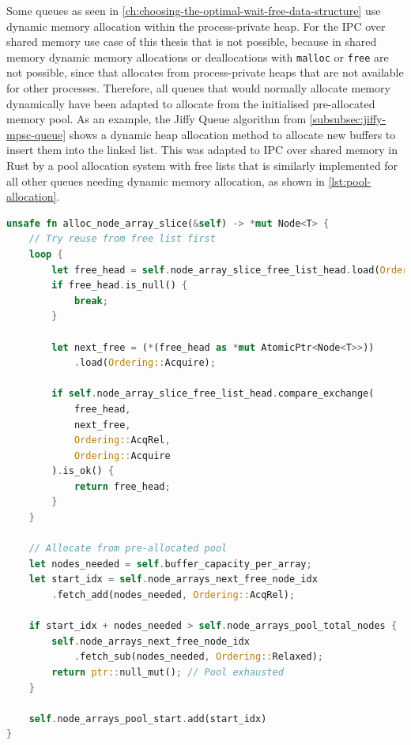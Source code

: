 Some queues as seen in \cref{ch:choosing-the-optimal-wait-free-data-structure} use dynamic memory allocation within the process-private heap. For the \ac{IPC} over shared memory use case of this thesis that is not possible, because in shared memory dynamic memory allocations or deallocations with \texttt{malloc} or \texttt{free} are not possible, since that allocates from process-private heaps that are not available for other processes. Therefore, all queues that would normally allocate memory dynamically have been adapted to allocate from the initialised pre-allocated memory pool. As an example, the Jiffy Queue algorithm from \cref{subsubsec:jiffy-mpsc-queue} shows a dynamic heap allocation method to allocate new buffers to insert them into the linked list. This was adapted to \ac{IPC} over shared memory in Rust by a pool allocation system with free lists that is similarly implemented for all other queues needing dynamic memory allocation, as shown in \cref{lst:pool-allocation}.

\begin{lstlisting}[language=Rust, style=boxed, caption={Lock-free memory pool allocation}, label={lst:pool-allocation}]
unsafe fn alloc_node_array_slice(&self) -> *mut Node<T> {
    // Try reuse from free list first
    loop {
        let free_head = self.node_array_slice_free_list_head.load(Ordering::Acquire);
        if free_head.is_null() {
            break;
        }
        
        let next_free = (*(free_head as *mut AtomicPtr<Node<T>>))
            .load(Ordering::Acquire);
            
        if self.node_array_slice_free_list_head.compare_exchange(
            free_head, 
            next_free, 
            Ordering::AcqRel, 
            Ordering::Acquire
        ).is_ok() {
            return free_head;
        }
    }
    
    // Allocate from pre-allocated pool
    let nodes_needed = self.buffer_capacity_per_array;
    let start_idx = self.node_arrays_next_free_node_idx
        .fetch_add(nodes_needed, Ordering::AcqRel);
        
    if start_idx + nodes_needed > self.node_arrays_pool_total_nodes {
        self.node_arrays_next_free_node_idx
            .fetch_sub(nodes_needed, Ordering::Relaxed);
        return ptr::null_mut(); // Pool exhausted
    }
    
    self.node_arrays_pool_start.add(start_idx)
}
\end{lstlisting}


